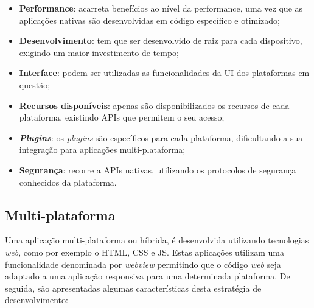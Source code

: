 \begin{itemize}
	\item \textbf{Performance}: acarreta benefícios ao nível da performance, uma vez que as aplicações nativas são desenvolvidas em código específico e otimizado; 

	\item \textbf{Desenvolvimento}: tem que ser desenvolvido de raiz para cada dispositivo, exigindo um maior investimento de tempo;
	
	\item \textbf{Interface}: podem ser utilizadas as funcionalidades da \ac{UI} dos plataformas em questão;
	
	\item \textbf{Recursos disponíveis}: apenas são disponibilizados os recursos de cada plataforma, existindo APIs que permitem o seu acesso;

	\item \textbf{\textit{Plugins}}: os \textit{plugins} são específicos para cada plataforma, dificultando a sua integração para aplicações multi-plataforma; 
	
	\item \textbf{Segurança}: recorre a APIs nativas, utilizando os protocolos de segurança conhecidos da plataforma.
	
\end{itemize}

\subsection{Multi-plataforma}


Uma aplicação multi-plataforma ou híbrida, é desenvolvida utilizando tecnologias \textit{web}, como por exemplo o \ac{HTML}, \ac{CSS} e \ac{JS}. Estas aplicações utilizam uma funcionalidade denominada por \textit{webview} permitindo que o código \textit{web} seja adaptado a uma aplicação responsiva para uma determinada plataforma. De seguida, são apresentadas algumas características desta estratégia de desenvolvimento\cite{Ibm2012a}: 


